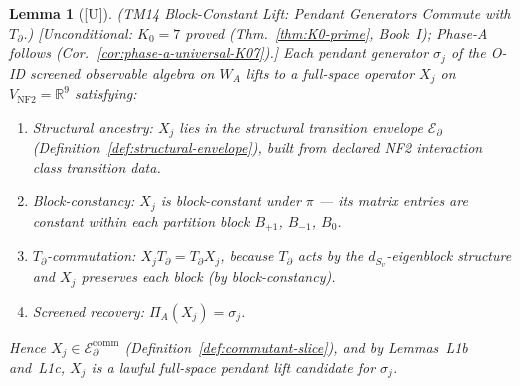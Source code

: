 \documentclass[12pt,oneside]{amsbook}
\theoremstyle{plain}
\newtheorem{lemma}[theorem]{Lemma}
\theoremstyle{definition}
\theoremstyle{remark}
\newcommand{\status}[1]{\textup{[#1]}}
\begin{document}
\begin{lemma}[\status{U}]\label{lem:S1a-pendant-T-commute}
\textup{(TM14 Block-Constant Lift: Pendant Generators Commute with
$T_\partial$.)}
\textup{[Unconditional: $K_0=7$ proved (Thm.~\ref{thm:K0-prime}, Book~I); Phase-A follows (Cor.~\ref{cor:phase-a-universal-K07}).]}
Each pendant generator $\sigma_j$ of the O-ID screened observable
algebra on $W_A$ lifts to a full-space operator $X_j$ on
$V_{\mathrm{NF2}} = \mathbb{R}^9$ satisfying:
\begin{enumerate}[label=\textup{(\arabic*)}]
 \item \emph{Structural ancestry}: $X_j$ lies in the structural
 transition envelope $\mathcal{E}_\partial$
 (Definition~\ref{def:structural-envelope}), built from declared
 NF2 interaction class transition data.
 \item \emph{Block-constancy}: $X_j$ is block-constant under $\pi$
 --- its matrix entries are constant within each partition block
 $B_{+1}$, $B_{-1}$, $B_0$.
 \item \emph{$T_\partial$-commutation}: $X_j T_\partial = T_\partial X_j$,
 because $T_\partial$ acts by the $d_{S_v}$-eigenblock structure
 and $X_j$ preserves each block (by block-constancy).
 \item \emph{Screened recovery}: $\Pi_A(X_j) = \sigma_j$.
\end{enumerate}
Hence $X_j \in \mathcal{E}_\partial^{\mathrm{comm}}$
(Definition~\ref{def:commutant-slice}), and by Lemmas~L1b and~L1c,
$X_j$ is a lawful full-space pendant lift candidate for $\sigma_j$.
\end{lemma}
\end{document}
